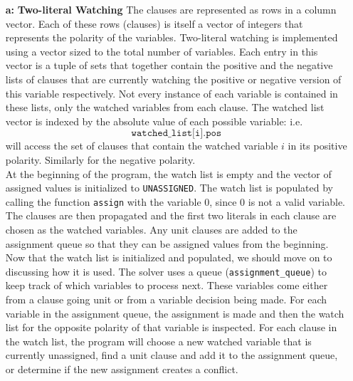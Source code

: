 \documentclass[9pt]{extarticle}
\begin{document}
\begin{homeworkProblem}[Implementation]
    
    \begin{enumerate}
        \item[\textbf{a:}] \textbf{Two-literal Watching}
            The clauses are represented as rows in a column vector. Each of these rows (clauses) is itself a vector 
            of integers that represents the polarity of the variables. Two-literal watching is implemented using a 
            vector sized to the total number of variables. Each entry in this vector is a tuple of sets that together 
            contain the positive and the negative lists of clauses that are currently watching the positive or 
            negative version of this variable respectively. Not every
            instance of each variable is contained in these lists, only the watched variables from each clause. The 
            watched list vector is indexed by the absolute value of each possible variable: i.e. 
            $$ \texttt{watched\_list[i].pos} $$  will access the set of clauses that contain the watched variable $i$ 
            in its positive polarity. Similarly for the negative polarity.\\

            At the beginning of the program, the watch list is empty and the vector of assigned values is initialized 
            to \texttt{UNASSIGNED}. The watch list is populated by calling the function {\tt assign} with the 
            variable 0, since 0 is not a valid variable.  The clauses are then propagated and the first two literals 
            in each clause are chosen as the watched variables. Any unit clauses are added to the assignment queue so 
            that they can be assigned values from the beginning.\\

            Now that the watch list is initialized and populated, we should move on to discussing how it is used. The 
            solver uses a queue (\texttt{assignment\_queue}) to keep track of which variables to process next. These 
            variables come either from a clause going unit or from a variable decision being made. For each variable 
            in the assignment queue, the assignment is made and then the watch list for the opposite polarity of that 
            variable is inspected. For each clause in the watch list, the program will choose a new watched variable 
            that is currently unassigned, find a unit clause and add it to the assignment queue, or determine if the 
            new assignment creates a conflict.\\


\end{enumerate}
\end{homeworkProblem}
\end{document}
